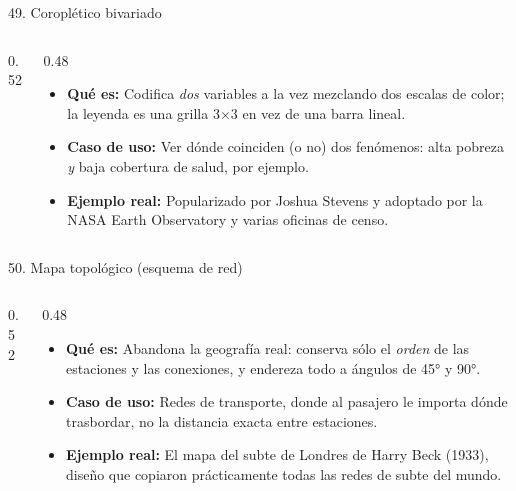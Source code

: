 \documentclass[aspectratio=169,9pt]{beamer}
\newcommand{\ficha}[3]{%
\begin{itemize}
\item \textbf{Qué es:} #1
\item \textbf{Caso de uso:} #2
\item \textbf{Ejemplo real:} #3
\end{itemize}}
\begin{document}
\begin{frame}{49. Coroplético bivariado}
\begin{columns}[T]
\begin{column}{0.52\textwidth}
\centering
{}
\end{column}
\begin{column}{0.48\textwidth}
\ficha{Codifica \emph{dos} variables a la vez mezclando dos escalas de color; la leyenda es una grilla 3$\times$3 en vez de una barra lineal.}
{Ver dónde coinciden (o no) dos fenómenos: alta pobreza \emph{y} baja cobertura de salud, por ejemplo.}
{Popularizado por Joshua Stevens y adoptado por la NASA Earth Observatory y varias oficinas de censo.}
\end{column}
\end{columns}
\end{frame}

\begin{frame}{50. Mapa topológico (esquema de red)}
\begin{columns}[T]
\begin{column}{0.52\textwidth}
\centering
{}
\end{column}
\begin{column}{0.48\textwidth}
\ficha{Abandona la geografía real: conserva sólo el \emph{orden} de las estaciones y las conexiones, y endereza todo a ángulos de 45° y 90°.}
{Redes de transporte, donde al pasajero le importa dónde trasbordar, no la distancia exacta entre estaciones.}
{El mapa del subte de Londres de Harry Beck (1933), diseño que copiaron prácticamente todas las redes de subte del mundo.}
\end{column}
\end{columns}
\end{frame}
\end{document}
